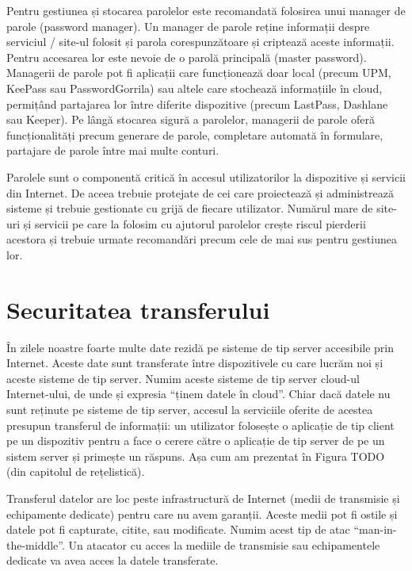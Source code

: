 Pentru gestiunea și stocarea parolelor este recomandată folosirea unui manager de parole (password manager). Un manager de parole reține informații despre serviciul / site-ul folosit și parola corespunzătoare și criptează aceste informații. Pentru accesarea lor este nevoie de o parolă principală (master password). Managerii de parole pot fi aplicații care funcționează doar local (precum UPM, KeePass sau PasswordGorrila) sau altele care stochează informațiile în cloud, permițând partajarea lor între diferite dispozitive (precum LastPass, Dashlane sau Keeper). Pe lângă stocarea sigură a parolelor, managerii de parole oferă funcționalități precum generare de parole, completare automată în formulare, partajare de parole între mai multe conturi.

Parolele sunt o componentă critică în accesul utilizatorilor la dispozitive și servicii din Internet. De aceea trebuie protejate de cei care proiectează și administrează sisteme și trebuie gestionate cu grijă de fiecare utilizator. Numărul mare de site-uri și servicii pe care la folosim cu ajutorul parolelor crește riscul pierderii acestora și trebuie urmate recomandări precum cele de mai sus pentru gestiunea lor.

\section{Securitatea transferului}
\label{sec:sec:transfer}

În zilele noastre foarte multe date rezidă pe sisteme de tip server accesibile prin Internet. Aceste date sunt transferate între dispozitivele cu care lucrăm noi și aceste sisteme de tip server. Numim aceste sisteme de tip server cloud-ul Internet-ului, de unde și expresia “ținem datele în cloud”. Chiar dacă datele nu sunt reținute pe sisteme de tip server, accesul la serviciile oferite de acestea presupun transferul de informații: un utilizator folosește o aplicație de tip client pe un dispozitiv pentru a face o cerere către o aplicație de tip server de pe un sistem server și primește un răspuns. Așa cum am prezentat în Figura TODO (din capitolul de rețelistică).

Transferul datelor are loc peste infrastructură de Internet (medii de transmisie și echipamente dedicate) pentru care nu avem garanții. Aceste medii pot fi ostile și datele pot fi capturate, citite, sau modificate. Numim acest tip de atac “man-in-the-middle”. Un atacator cu acces la mediile de transmisie sau echipamentele dedicate va avea acces la datele transferate.

